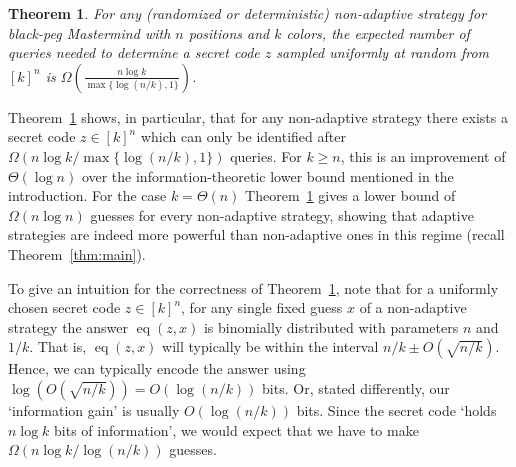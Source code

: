 \documentclass[english,a4paper,11pt]{article}
\DeclareMathOperator{\eq}{eq}
\newtheorem{theorem}{Theorem}
\begin{document}
{\begin{theorem} 
\label{thm:nonadaptive}
For any (randomized or deterministic) non-adaptive strategy for black-peg Mastermind with $n$ positions and $k$ colors, the expected number of queries needed to determine a secret code $z$ sampled uniformly at random from $[k]^n$ is
$\Omega \left( \frac{n \log k}{\max\{\log(n/k), 1\}} \right)$.
\end{theorem}

Theorem~\ref{thm:nonadaptive} shows, in particular, that for any non-adaptive strategy there exists a secret code $z\in[k]^n$ which can only be identified after $\Omega\left(n \log k / \max\{\log(n/k), 1\} \right)$ queries. For $k\geq n$, this is an improvement of $\Theta(\log n)$ over the information-theoretic lower bound mentioned in the introduction. 
%
For the case $k=\Theta(n)$ Theorem~\ref{thm:nonadaptive} gives a lower bound of $\Omega(n \log n)$ guesses for every non-adaptive strategy, showing that adaptive strategies are indeed more powerful than non-adaptive ones in this regime (recall Theorem~\ref{thm:main}). 

To give an intuition for the correctness of Theorem~\ref{thm:nonadaptive}, note that for a uniformly chosen secret code $z \in [k]^n$, for any single fixed guess $x$ of a non-adaptive strategy the answer $\eq(z,x)$ is binomially distributed with parameters $n$ and $1/k$. 
That is, $\eq(z,x)$ will typically be within the interval $n/k \pm O(\sqrt{n/k})$.
Hence, we can typically encode the answer using $\log( O(\sqrt{n/k})) = O(\log(n/k))$ bits. Or, stated differently, our `information gain' is usually $O(\log(n/k))$ bits. Since the secret code `holds $n \log k$ bits of information', we would expect that we have to make $\Omega(n \log k / \log(n/k))$ guesses.

}
\end{document}
